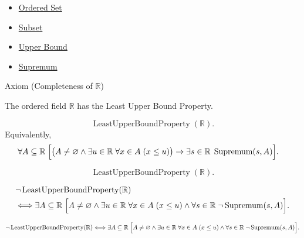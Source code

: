 \begin{dependencies}
\begin{itemize}
  \item \hyperref[def:ordered-set]{Ordered Set}
  \item \hyperref[def:subset]{Subset}
  \item \hyperref[def:upper-bound]{Upper Bound}
  \item \hyperref[def:supremum]{Supremum}
\end{itemize}
\end{dependencies}






\begin{axiombox}{Axiom (Completeness of $\mathbb{R}$)}
\begin{axiom}
\label{ax:completeness-of-reals}
The ordered field $\mathbb{R}$ has the Least Upper Bound Property.
\end{axiom}
\end{axiombox}

\begin{remark*}
\[
\operatorname{LeastUpperBoundProperty}(\mathbb{R}).
\]
Equivalently,
\[
\begin{aligned}
&\forall A\subseteq\mathbb{R}\;
\Bigl[
\bigl(A\neq\varnothing \land \exists u\in\mathbb{R}\;\forall x\in A\;(x\le u)\bigr)
\rightarrow
\exists s\in\mathbb{R}\;\operatorname{Supremum}(s,A)
\Bigr].
\end{aligned}
\]
\end{remark*}

\begin{remark*}
\[
\operatorname{LeastUpperBoundProperty}(\mathbb{R}).
\]
\end{remark*}

\begin{remark*}
\[
\begin{aligned}
&\neg\operatorname{LeastUpperBoundProperty}(\mathbb{R})\\
&\Longleftrightarrow
\exists A\subseteq\mathbb{R}\;
\Bigl[
A\neq\varnothing
\land
\exists u\in\mathbb{R}\;\forall x\in A\;(x\le u)
\land
\forall s\in\mathbb{R}\;\neg\operatorname{Supremum}(s,A)
\Bigr].
\end{aligned}
\]
\end{remark*}

\begin{remark*}
\[
\neg\operatorname{LeastUpperBoundProperty}(\mathbb{R})\Longleftrightarrow
\exists A\subseteq\mathbb{R}\;
\Bigl[
A\neq\varnothing
\land
\exists u\in\mathbb{R}\;\forall x\in A\;(x\le u)
\land
\forall s\in\mathbb{R}\;\neg\operatorname{Supremum}(s,A)
\Bigr].
\]
\end{remark*}


